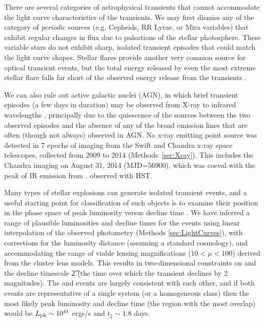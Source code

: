 There are several categories of
astrophysical transients that cannot accommodate the light curve
characteristics of the \spock transients.  We may first dismiss any of
the category of {\it periodic} sources (e.g. Cepheids, RR Lyrae, or
Mira variables) that exhibit regular changes in flux due to pulsations
of the stellar photosphere. These variable stars do not exhibit sharp,
isolated transient episodes that could match the \spock light curve
shapes. Stellar flares provide another very common source for optical
transient events, but the total energy released by even the most
extreme stellar flare falls far short of the observed energy release
from the \spock transients \citep{Balona:2012,Karoff:2016} .

We can also rule out active galactic nuclei (AGN), in which
brief transient episodes (a few days in duration) may be observed from
X-ray to infrared wavelengths \citep[e.g.][]{Gaskell:2003},
principally due to the quiescence of the \spock sources between the
two observed episodes and the absence of any of the broad emission
lines that are often (though not always) observed in AGN.  No x-ray
emitting point source was detected in 7 epochs of imaging from
the Swift and Chandra x-ray space telescopes, collected from 2009 to
2014 (Methods~\ref{sec:Xray}).  This includes the Chandra imaging on
August 31, 2014 (MJD=56900), which was coeval with the peak
of IR emission from \spocktwo, observed with HST.

Many types of stellar explosions can generate isolated
transient events, and a useful starting point for classification of
such objects is to examine their position in the phase
space of peak luminosity versus decline time \citep[see,
  e.g.,][]{Kulkarni:2007}. We have inferred a range of plausible
luminosities and decline times for the \spock events using linear
interpolation of the observed photometry (Methods
\ref{sec:LightCurves}), with corrections for the luminosity distance
(assuming a standard \LCDM cosmology), and accommodating the range of
viable lensing magnifications ($10<\mu<100$) derived from the cluster
lens models. This results in two-dimensional constraints on \Lpk and
the decline timescale \t2 (the time over which the transient declines
by 2 magnitudes). The \spockone and \spocktwo events are largely
consistent with each other, and if both events are representative of a
single system (or a homogeneous class) then the most likely peak
luminosity and decline time (the region with the most overlap) would
be $L_{\rm pk}\sim10^{41}$ ergs/s and $t_2\sim1.8$ days.

